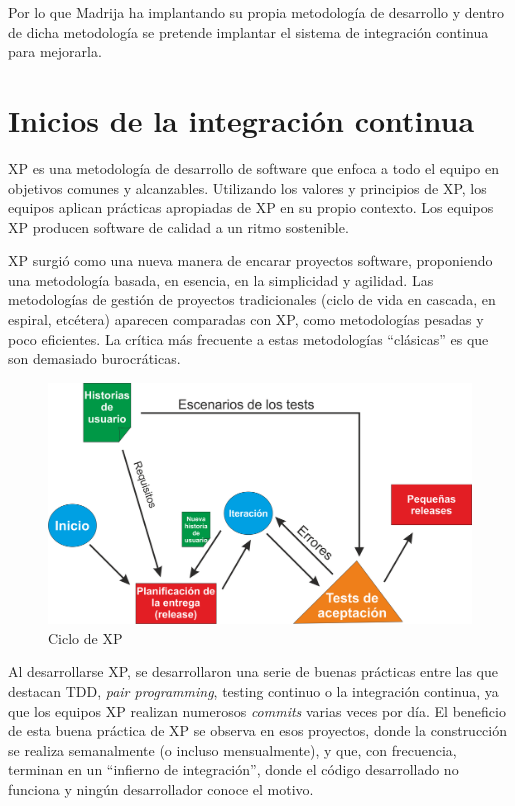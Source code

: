 Por lo que \ac{Madrija} ha implantando su propia metodología de desarrollo y dentro de dicha metodología se pretende implantar el sistema de integración continua para mejorarla.

\section{Inicios de la integración continua}

\ac{XP} es una metodología de desarrollo de software que enfoca a todo el equipo en objetivos comunes y alcanzables\cite{XP}. Utilizando los valores y principios de \ac{XP}, los equipos aplican prácticas apropiadas de XP en su propio contexto. Los equipos \ac{XP} producen software de calidad a un ritmo sostenible.

\ac{XP} surgió como una nueva manera de encarar proyectos software\cite{ReglasPracticasXP}, proponiendo una metodología basada, en esencia, en la simplicidad y agilidad. Las metodologías de gestión de proyectos tradicionales (ciclo de vida en cascada, en espiral, etcétera) aparecen comparadas con \ac{XP}, como metodologías pesadas y poco eficientes. La crítica más frecuente a estas metodologías “clásicas” es que son demasiado burocráticas.


\begin{figure}[!h]
\centering
   \includegraphics[width=15cm]{Ciclo_XP.png}
\caption{Ciclo de \ac{XP}\cite{Foto_XP}}
\end{figure}

Al desarrollarse \ac{XP}, se desarrollaron una serie de buenas prácticas entre las que destacan \ac{TDD}, \textit{pair programming}, testing continuo o la integración continua, ya que los equipos \ac{XP} realizan numerosos \textit{commits} varias veces por día.
El beneficio de esta buena práctica de \ac{XP} se observa en esos proyectos, donde la construcción se realiza semanalmente (o incluso mensualmente), y que, con frecuencia, terminan en un ``infierno de integración'', donde el código desarrollado no funciona y ningún desarrollador conoce el motivo.

